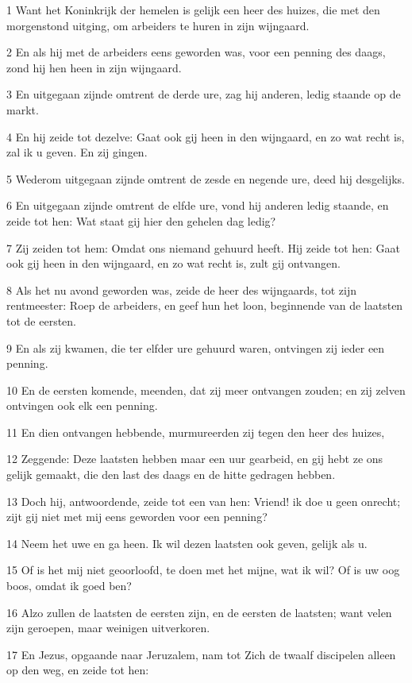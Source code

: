 \par 1 Want het Koninkrijk der hemelen is gelijk een heer des huizes, die met den morgenstond uitging, om arbeiders te huren in zijn wijngaard.
\par 2 En als hij met de arbeiders eens geworden was, voor een penning des daags, zond hij hen heen in zijn wijngaard.
\par 3 En uitgegaan zijnde omtrent de derde ure, zag hij anderen, ledig staande op de markt.
\par 4 En hij zeide tot dezelve: Gaat ook gij heen in den wijngaard, en zo wat recht is, zal ik u geven. En zij gingen.
\par 5 Wederom uitgegaan zijnde omtrent de zesde en negende ure, deed hij desgelijks.
\par 6 En uitgegaan zijnde omtrent de elfde ure, vond hij anderen ledig staande, en zeide tot hen: Wat staat gij hier den gehelen dag ledig?
\par 7 Zij zeiden tot hem: Omdat ons niemand gehuurd heeft. Hij zeide tot hen: Gaat ook gij heen in den wijngaard, en zo wat recht is, zult gij ontvangen.
\par 8 Als het nu avond geworden was, zeide de heer des wijngaards, tot zijn rentmeester: Roep de arbeiders, en geef hun het loon, beginnende van de laatsten tot de eersten.
\par 9 En als zij kwamen, die ter elfder ure gehuurd waren, ontvingen zij ieder een penning.
\par 10 En de eersten komende, meenden, dat zij meer ontvangen zouden; en zij zelven ontvingen ook elk een penning.
\par 11 En dien ontvangen hebbende, murmureerden zij tegen den heer des huizes,
\par 12 Zeggende: Deze laatsten hebben maar een uur gearbeid, en gij hebt ze ons gelijk gemaakt, die den last des daags en de hitte gedragen hebben.
\par 13 Doch hij, antwoordende, zeide tot een van hen: Vriend! ik doe u geen onrecht; zijt gij niet met mij eens geworden voor een penning?
\par 14 Neem het uwe en ga heen. Ik wil dezen laatsten ook geven, gelijk als u.
\par 15 Of is het mij niet geoorloofd, te doen met het mijne, wat ik wil? Of is uw oog boos, omdat ik goed ben?
\par 16 Alzo zullen de laatsten de eersten zijn, en de eersten de laatsten; want velen zijn geroepen, maar weinigen uitverkoren.
\par 17 En Jezus, opgaande naar Jeruzalem, nam tot Zich de twaalf discipelen alleen op den weg, en zeide tot hen:
